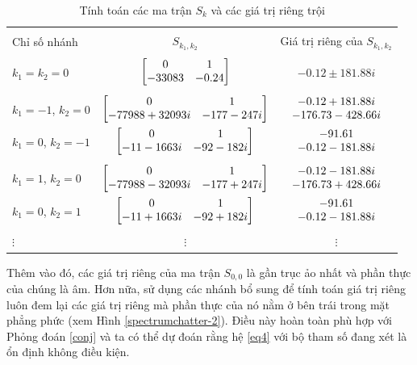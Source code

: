 \begin{table}[!h]
\centering
\begin{tabular}{lcc}
\hline \\[-.35cm]	
Chỉ số nhánh & $S_{k_1,k_2}$ & Giá trị riêng của $S_{k_1,k_2}$ \\ \hline \\[-.35cm]
$k_1 = k_2 = 0$		   & $\begin{bmatrix} 0 & 1 \\ -33083 & -0.24 \end{bmatrix}$ & $-0.12 \pm 181.88 i$ \\ \hline \\[-.35cm]
$k_1 = -1$, $k_2 = 0$  & $\begin{bmatrix} 0 & 1 \\ -77988 + 32093i & -177 - 247i  \end{bmatrix}$ &  
$\begin{matrix} - 0.12 + 181.88 i \\ -176.73 - 428.66i \end{matrix}$ \\ 
$k_1 = 0$, $k_2 = -1$	& $\begin{bmatrix} 0 & 1 \\ -11 - 1663i & -92 - 182i \end{bmatrix}$  &  $\begin{matrix}  -91.61 \\ - 0.12-181.88i \end{matrix}$ \\ \hline \\[-.35cm]
$k_1 = 1$, $k_2 = 0$   & $\begin{bmatrix} 0 & 1 \\ -77988 - 32093i & -177 + 247i \end{bmatrix}$ &  
$\begin{matrix} - 0.12 - 181.88 i \\ -176.73 + 428.66i \end{matrix}$ \\ 
$k_1 = 0$, $k_2 = 1$	& $\begin{bmatrix} 0 & 1 \\ -11 + 1663i & -92 + 182i \end{bmatrix}$  &  $\begin{matrix}  -91.61 \\ - 0.12-181.88i \end{matrix}$ \\ \hline \\[-.35cm]
$\vdots$ & $\vdots$ & $\vdots$ \\ \hline
\end{tabular} 
\caption{Tính toán các ma trận $S_k$ và các giá trị riêng trội}
\label{bang 3}
\end{table}

Thêm vào đó, các giá trị riêng của ma trận $S_{0,0}$ là gần trục ảo nhất và phần thực của chúng là âm. Hơn nữa, sử dụng các nhánh bổ sung để tính toán giá trị riêng luôn đem lại các giá trị riêng mà phần thực của nó nằm ở bên trái trong mặt phẳng phức (xem Hình \ref{spectrumchatter-2}). 
Điều này hoàn toàn phù hợp với Phỏng đoán \ref{conj} và ta có thể dự đoán rằng hệ \eqref{eq4} với bộ tham số đang xét là ổn định không điều kiện.\

